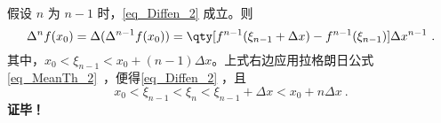 假设 $n$ 为 $n-1$ 时，\autoref{eq_Diffen_2} 成立。则
\begin{equation}
\Delta^n f(x_0)=\Delta(\Delta^{n-1}f(x_0))=\qty[f^{n-1}(\xi_{n-1}+\Delta x)-f^{n-1}(\xi_{n-1})]\Delta x^{n-1}~.
\end{equation}
其中，$x_0<\xi_{n-1}<x_0+(n-1)\Delta x$。上式右边应用拉格朗日公式\autoref{eq_MeanTh_2}~，便得\autoref{eq_Diffen_2} ，且
\begin{equation}
x_0<\xi_{n-1}<\xi_n<\xi_{n-1}+\Delta x<x_0+n\Delta x~.
\end{equation}
\textbf{证毕！}
